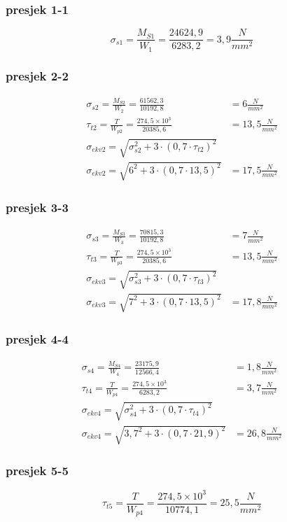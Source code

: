 \documentclass[12pt,a4paper]{article}
\begin{document}
\subsubsection*{presjek 1-1}
$$
\sigma_{s1}=\frac{M_{S1}}{W_1}=\frac{24624,9}{6283,2}=3,9\textstyle\frac{N}{mm^2}
$$
\subsubsection*{presjek 2-2}
\begin{align*}
\sigma_{s2}=\frac{M_{S2}}{W_2}=\frac{61562,3}{10192,8}&=6\textstyle\frac{N}{mm^2}\\
\tau_{t2} =\frac{T}{W_{p2}}=\frac{274,5 \times 10^3}{20385,6}&=13,5\textstyle\frac{N}{mm^2}\\
\sigma_{ekv2}=\sqrt{\sigma_{s2}^2+3 \cdot (0,7 \cdot \tau_{t2})^2}\\
\sigma_{ekv2}=\sqrt{6^2+3 \cdot (0,7 \cdot 13,5)^2}&=17,5\textstyle\frac{N}{mm^2}
\end{align*}
\subsubsection*{presjek 3-3}
\begin{align*}
\sigma_{s3}=\frac{M_{S3}}{W_3}=\frac{70815,3}{10192,8}&=7\textstyle\frac{N}{mm^2}\\
\tau_{t3} =\frac{T}{W_{p3}}=\frac{274,5 \times 10^3}{20385,6}&=13,5\textstyle\frac{N}{mm^2}\\
\sigma_{ekv3}=\sqrt{\sigma_{s3}^2+3 \cdot (0,7 \cdot \tau_{t3})^2}\\
\sigma_{ekv3}=\sqrt{7^2+3 \cdot (0,7 \cdot 13,5)^2}&=17,8 \textstyle \frac{N}{mm^2}
\end{align*}
\subsubsection*{presjek 4-4}
\begin{align*}
\sigma_{s4}=\frac{M_{S4}}{W_4}=\frac{23175,9}{12566,4}&=1,8\textstyle\frac{N}{mm^2}\\
\tau_{t4} =\frac{T}{W_{p4}}=\frac{274,5 \times 10^3}{6283,2}&=3,7\textstyle\frac{N}{mm^2}\\
\sigma_{ekv4}=\sqrt{\sigma_{s4}^2+3 \cdot (0,7 \cdot \tau_{t4})^2}\\
\sigma_{ekv4}=\sqrt{3,7^2+3 \cdot (0,7 \cdot 21,9)^2}&=26,8 \textstyle\frac{N}{mm^2}
\end{align*}
\subsubsection*{presjek 5-5}
$$
\tau_{t5} =\frac{T}{W_{p4}}=\frac{274,5 \times 10^3}{10774,1}=25,5\textstyle\frac{N}{mm^2}
$$
\end{document}
